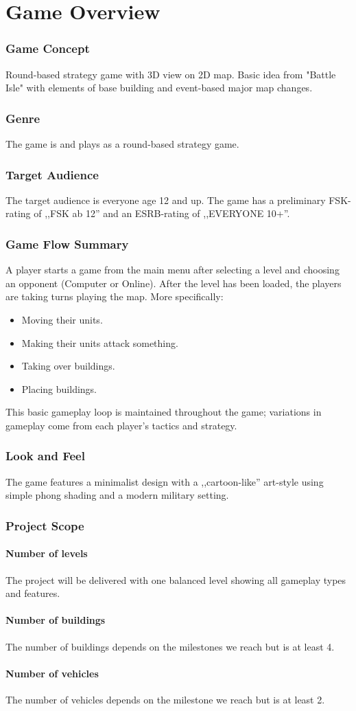 \part{Game Overview}
\section{Game Concept}
Round-based strategy game with 3D view on 2D map. Basic idea from "Battle Isle" with elements of base building and
event-based major map changes.
\section{Genre}
The game is and plays as a round-based strategy game.
\section{Target Audience}
The target audience is everyone age 12 and up. The game has a preliminary FSK-rating of ,,FSK ab 12'' and an ESRB-rating of ,,EVERYONE 10+''.
\section{Game Flow Summary}
A player starts a game from the main menu after selecting a level and choosing an opponent (Computer or Online).
After the level has been loaded, the players are taking turns playing the map. More specifically:
\begin{itemize}
    \item Moving their units.
    \item Making their units attack something.
    \item Taking over buildings.
    \item Placing buildings.
\end{itemize}
This basic gameplay loop is maintained throughout the game; variations in
gameplay come from each player's tactics and strategy.
\section{Look and Feel}
The game features a minimalist design with a ,,cartoon-like'' art-style using simple phong shading and a modern military setting.
\section{Project Scope}
\subsection{Number of levels}
The project will be delivered with one balanced level showing all gameplay types and features.
\subsection{Number of buildings}
The number of buildings depends on the milestones we reach but is at least 4.
\subsection{Number of vehicles}
The number of vehicles depends on the milestone we reach but is at least 2.
